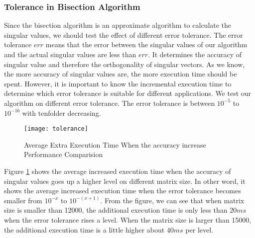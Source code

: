 \subsubsection{Tolerance in Bisection Algorithm}
Since the bisection algorithm is an approximate algorithm to calculate the singular values, we should test the effect of different error tolerance.
The error tolerance $err$ means that the error between the singular values of our algorithm and the actual singular values are less than $err$.
It determines the accuracy of singular value and therefore the orthogonality of singular vectors.
As we know, the more accuracy of singular values are, the more execution time should be spent.
However, it is important to know the incremental execution time to determine which error tolerance is suitable for different applications.
We test our algorithm on different error tolerance.
The error tolerance is between $10^{-5}$ to $10^{-16}$ with tenfolder decreasing.

\begin{figure}[hbpt]
\centering
\texttt{[image: tolerance]}
\caption{Average Extra Execution Time When the accuracy increase Performance Comparision}
\label{fig:tolerance}
\end{figure}
Figure \ref{fig:tolerance} shows the average increased execution time when the accuracy of singular values goes up a higher level on different matrix size.
In other word, it shows the average increased execution time when the error tolerance becomes smaller from $10^{-x}$ to $10^{-(x+1)}$.
From the figure, we can see that when matrix size is smaller than 12000, the additional execution time is only less than $20 ms$ when the error tolerance rises a level.
When the matrix size is larger than 15000, the additional execution time is a little higher about $40 ms$ per level.
\fi


